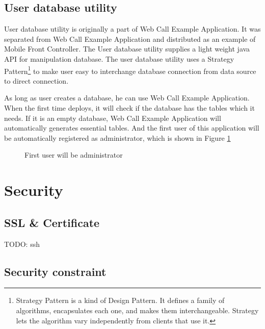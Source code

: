 \subsection{User database utility}
\label{sec:WebApplication:Database:UserDatabaseUtility}

User database utility is originally a part of Web Call Example Application. It was separated from Web Call Example Application and distributed as an example of Mobile Front Controller. The User database utility supplies a light weight java API for manipulation database. The user database utility uses a Strategy Pattern\footnote{Strategy Pattern is a kind of Design Pattern. It defines a family of algorithms, encapsulates each one, and makes them interchangeable. Strategy lets the algorithm vary independently from clients that use it.} to make user easy to interchange database connection from data source to direct connection. 

As long as user creates a database, he can use Web Call Example Application. When the first time deploys, it will check if the database has the tables which it needs. If it is an empty database, Web Call Example Application will automatically generates essential tables. And the first user of this application will be automatically registered as administrator, which is shown in Figure \ref{fig:FirstUser}

\begin{figure}[!hbtp]
\centering
{}
\caption{First user will be administrator}
\label{fig:FirstUser}
\end{figure} 

\section{Security}
\label{sec:WebApplication:Security}

\subsection{SSL & Certificate}
\label{sec:WebApplication:Security:Certificate}

TODO: ssh

\subsection{Security constraint}
\label{sec:WebApplication:Security:SecurityConstraint}




